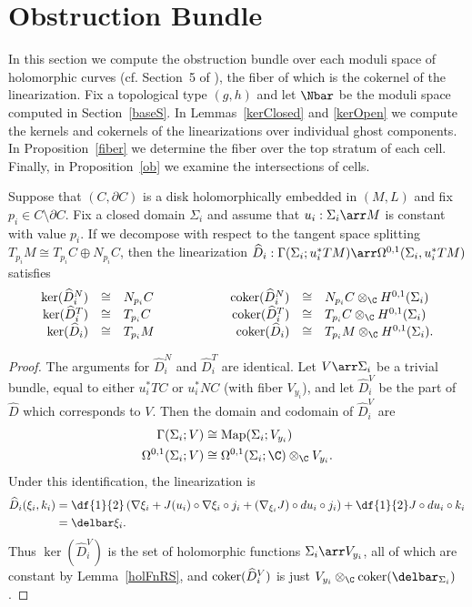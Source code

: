 \section{Obstruction Bundle} \label{obS}

In this section we compute the obstruction bundle over each moduli space of holomorphic curves (cf. Section~5 of \cite{dw}), the fiber of which is the cokernel of the linearization. 
Fix a topological type $(g,h)$ and let $\Nbar$ be the moduli space computed in Section~\ref{baseS}. In Lemmas~\ref{kerClosed} and \ref{kerOpen} we compute the kernels and cokernels of the linearizations over individual ghost components. In Proposition~\ref{fiber} we determine the fiber over the top stratum of each cell. Finally, in Proposition~\ref{ob} we examine the intersections of cells.

\begin{lemma} \label{kerClosed}
Suppose that $(C,\partial C)$ is a disk holomorphically embedded in $(M,L)$ and fix $p_i \in C\setminus\partial C$. Fix a closed domain $\Sigma_i$ and assume that $u_i:\Sigma_i \arr M$ is constant with value $p_i$. 
If we decompose with respect to the tangent space splitting $T_{p_i}M \cong T_{p_i}C \oplus N_{p_i}C$, then the linearization $\hat{D}_i:\Gamma(\Sigma_i;u_i^*TM)\arr\Omega^{0,1}(\Sigma_i,u_i^*TM)$ satisfies
\[
\begin{array}{rclcrcl}
\ker(\hat{D}_i^N) & \cong & N_{p_i}C & \qquad\qquad & \coker(\hat{D}_i^N) & \cong & N_{p_i}C \otimes_\C H^{0,1}(\Sigma_i)
\\
\ker(\hat{D}_i^T) & \cong & T_{p_i}C && \coker(\hat{D}_i^T) & \cong & T_{p_i}C \otimes_\C H^{0,1}(\Sigma_i)
\\
\ker(\hat{D}_i) & \cong & T_{p_i}M && \coker(\hat{D}_i) & \cong & T_{p_i}M \otimes_\C H^{0,1}(\Sigma_i).
\end{array}
\]
\begin{proof}
The arguments for $\hat{D}_i^N$ and $\hat{D}_i^T$ are identical. Let $V \arr \Sigma_i$ be a trivial bundle, equal to either $u_i^*TC$ or $u_i^*NC$ (with fiber $V_{y_i}$), and let $\hat{D}_i^V$ be the part of $\hat{D}$ which corresponds to $V$. Then the domain and codomain of $\hat{D}_i^V$ are
\begin{align*}
\Gamma(\Sigma_i; V) & \cong \Map(\Sigma_i;V_{y_i})
\\
\Omega^{0,1}(\Sigma_i;V) & \cong \Omega^{0,1}(\Sigma_i;\C) \otimes_\C V_{y_i}.
\end{align*}
Under this identification, the linearization is
\begin{align*}
\hat{D}_i(\xi_i,k_i) & = \df{1}{2} \left( \nabla\xi_i + J(u_i) \circ \nabla\xi_i \circ j_i + (\nabla_{\xi_i} J) \circ du_i \circ j_i \right) + \df{1}{2}J \circ du_i \circ k_i
\\
& = \delbar\xi_i.
\end{align*}
Thus $\ker(\hat{D}_i^V)$ is the set of holomorphic functions $\Sigma_i \arr V_{y_i}$, all of which are constant by Lemma~\ref{holFnRS}, and $\operatorname{coker}(\widehat{D}_i^V)$ is just $V_{y_i} \otimes_\C \coker(\delbar_{\Sigma_i})$.
\end{proof}
\end{lemma}

